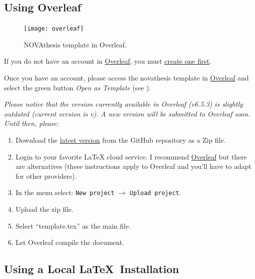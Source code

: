 \subsection{Using Overleaf}
\label{sub:using_overleaf}

\begin{figure}
\vspace*{-10ex}
\texttt{[image: overleaf]}%
\caption{NOVAthesis template in Overleaf.}
\label{fig:overleaf}
\end{figure}

If you do not have an account in \href{https://www.overleaf.com?r=f5160636&rm=d&rs=b}{Overleaf}, you must \href{https://www.overleaf.com?r=f5160636&rm=d&rs=b}{create one first}.

Once you have an account, please access the \gls{novathesis} template in \href{https://www.overleaf.com/latex/templates/new-university-of-lisbon-universidade-nova-de-lisboa-slash-unl-thesis-template/fwbztcrptjmg}{Overleaf} and select the green button \emph{Open as Template} (see ).

\bgroup
  \itshape
  Please notice that the version currently available in Overleaf (v6.5.3) is slightly outdated (current version is v\novathesisversion). A new version will be submitted to Overleaf soon.  Until then, please:
  \begin{enumerate}
    \item Download the \href{https://github.com/joaomlourenco/novathesis/archive/master.zip}{latest version} from the GitHub repository as a Zip file.
    \item Login to your favorite LaTeX cloud service. I recommend \href{https://www.overleaf.com/?r=f5160636&rm=d&rs=b}{Overleaf} but there are alternatives (these instructions apply to Overleaf and you'll have to adapt for other providers).
    \item In the menu select: \texttt{New project} $\rightarrow$ \texttt{Upload project}.
    \item Upload the zip file.
    \item Select “template.tex” as the main file.
    \item Let Overleaf compile the document.
  \end{enumerate}
\egroup

\subsection{Using a Local \LaTeX\ Installation}
\label{sub:using_local_latex}


